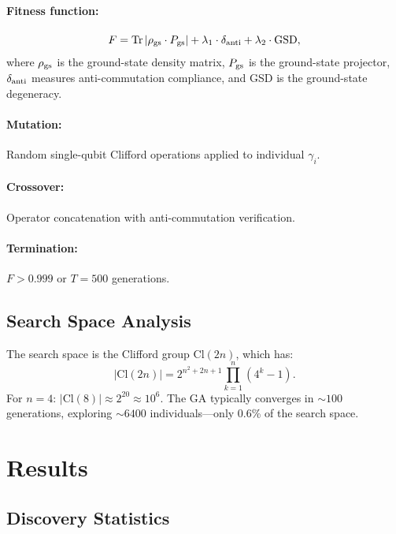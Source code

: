 \documentclass[aps,prx,reprint]{revtex4-2}
\begin{document}
\paragraph{Fitness function:}
\begin{equation}
F = \mathrm{Tr}\left|\rho_{\rm gs} \cdot P_{\rm gs}\right| + \lambda_1 \cdot \delta_{\rm anti} + \lambda_2 \cdot \mathrm{GSD},
\end{equation}
where $\rho_{\rm gs}$ is the ground-state density matrix, $P_{\rm gs}$ is the ground-state projector, $\delta_{\rm anti}$ measures anti-commutation compliance, and GSD is the ground-state degeneracy.

\paragraph{Mutation:} Random single-qubit Clifford operations applied to individual $\gamma_i$.

\paragraph{Crossover:} Operator concatenation with anti-commutation verification.

\paragraph{Termination:} $F > 0.999$ or $T = 500$ generations.

\subsection{Search Space Analysis}

The search space is the Clifford group $\mathrm{Cl}(2n)$, which has:
\begin{equation}
|\mathrm{Cl}(2n)| = 2^{n^2+2n+1}\prod_{k=1}^n(4^k-1).
\end{equation}
For $n=4$: $|\mathrm{Cl}(8)| \approx 2^{20} \approx 10^6$. The GA typically converges in $\sim 100$ generations, exploring $\sim 6400$ individuals---only 0.6\% of the search space.

\section{Results}
\label{sec:results}

\subsection{Discovery Statistics}
\end{document}
